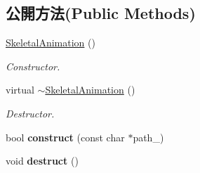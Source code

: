 \subsection*{公開方法(Public Methods)}
\begin{DoxyCompactItemize}
\item 
\hyperlink{class_magnum_1_1_skeletal_animation_a6d2c0b5ccd39942f1f97a6a33e69fd1c}{Skeletal\+Animation} ()\hypertarget{class_magnum_1_1_skeletal_animation_a6d2c0b5ccd39942f1f97a6a33e69fd1c}{}\label{class_magnum_1_1_skeletal_animation_a6d2c0b5ccd39942f1f97a6a33e69fd1c}

\begin{DoxyCompactList}\small\item\em Constructor. \end{DoxyCompactList}\item 
virtual \hyperlink{class_magnum_1_1_skeletal_animation_aba3db5d39b274ba4925bcea7702724ad}{$\sim$\+Skeletal\+Animation} ()\hypertarget{class_magnum_1_1_skeletal_animation_aba3db5d39b274ba4925bcea7702724ad}{}\label{class_magnum_1_1_skeletal_animation_aba3db5d39b274ba4925bcea7702724ad}

\begin{DoxyCompactList}\small\item\em Destructor. \end{DoxyCompactList}\item 
bool {\bfseries construct} (const char $\ast$path\+\_\+)\hypertarget{class_magnum_1_1_skeletal_animation_a434ff578b04bc9307c218bff64ee8a83}{}\label{class_magnum_1_1_skeletal_animation_a434ff578b04bc9307c218bff64ee8a83}

\item 
void {\bfseries destruct} ()\hypertarget{class_magnum_1_1_skeletal_animation_aba4c1c57fafe3fc65cdb077b0d7620bc}{}\label{class_magnum_1_1_skeletal_animation_aba4c1c57fafe3fc65cdb077b0d7620bc}


\end{DoxyCompactItemize}

